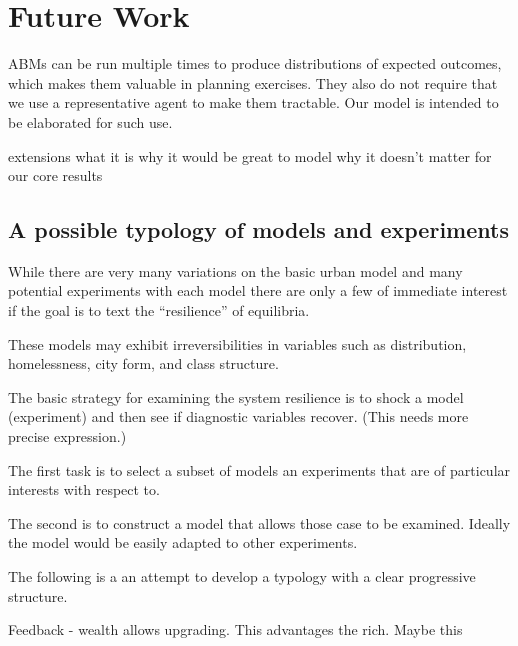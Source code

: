 \chapter[Future Work]{Future Work}
\label{appendix-future-work}

ABMs can be run multiple times to produce distributions of expected outcomes, which makes them valuable in planning exercises. They also do not require that we use a representative agent to make them tractable. Our model is intended to be elaborated  for such use. 

extensions
what it is
why it would be great to model
why it doesn't matter for our core results

\section{A possible typology of models and experiments}
While there  are very many variations on the basic urban model and many potential experiments with each model there are only a few of immediate interest if the goal is to text the ``resilience'' of equilibria.

These models may exhibit irreversibilities in variables such as distribution, homelessness, city form, and class structure. 

The basic strategy for examining the system resilience is to shock a model (experiment) and then see if diagnostic variables recover. (This needs more precise expression.)

The first task is to select a subset of models an experiments that are of particular interests with respect to.

The second is to construct a model that allows those case to be examined. Ideally the model would be easily adapted to other experiments.

The following is a an attempt to develop a typology with a clear progressive structure.

Feedback - wealth allows upgrading. This advantages the rich. Maybe this 

